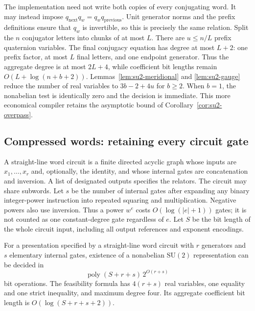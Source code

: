 \begin{remark}
The implementation need not write both copies of every conjugating word.
It may instead impose $q_{\mathrm{next}}q_w=q_wq_{\mathrm{previous}}$.
Unit generator norms and the prefix definitions ensure that $q_w$ is
invertible, so this is precisely the same relation.  Split the $n$
conjugator letters into chunks of at most $L$.  There are
$u\leq n/L$ prefix quaternion variables.  The final conjugacy equation
has degree at most $L+2$: one prefix factor, at most $L$ final letters,
and one endpoint generator.  Thus the aggregate degree is at most
$2L+4$, while coefficient bit lengths remain
$O(L+\log(n+b+2))$.  Lemmas~\ref{lem:su2-meridional} and
\ref{lem:su2-gauge} reduce the number of real variables to
$3b-2+4u$ for $b\geq2$.  When $b=1$, the nonabelian test is identically
zero and the decision is immediate.  This more economical compiler
retains the asymptotic bound of Corollary~\ref{cor:su2-overpass}.
\end{remark}

\subsection{Compressed words: retaining every circuit gate}

A straight-line word circuit is a finite directed acyclic graph whose
inputs are $x_1,\ldots,x_r$ and, optionally, the identity, and whose
internal gates are concatenation and inversion.  A list of designated
outputs specifies the relators.  The circuit may share subwords.  Let $s$
be the number of internal gates after expanding any binary integer-power
instruction into repeated squaring and multiplication.  Negative powers
also use inversion.  Thus a power $w^e$ costs $O(\log(|e|+1))$ gates;
it is not counted as one constant-degree gate regardless of $e$.
Let $S$ be the bit length of the whole circuit input, including all output
references and exponent encodings.

\begin{theorem}
\label{thm:su2-slp}
For a presentation specified by a straight-line word circuit with $r$
generators and $s$ elementary internal gates, existence of a nonabelian
$\mathrm{SU}(2)$ representation can be decided in
\[
 \operatorname{poly}(S+r+s)\,2^{O(r+s)}
\]
bit operations.  The feasibility formula has $4(r+s)$ real variables,
one equality and one strict inequality, and maximum degree four.
Its aggregate coefficient bit length is $O(\log(S+r+s+2))$.
\end{theorem}

